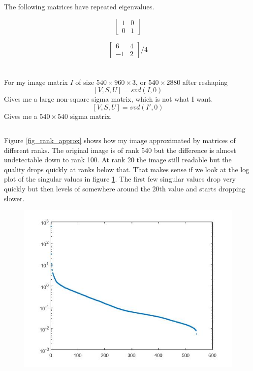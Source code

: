\documentclass[12pt]{article}
\begin{document}
The following matrices have repeated eigenvalues. 

\[
\begin{bmatrix}
    1 & 0 \\
    0 & 1
\end{bmatrix}
\]

\[
\begin{bmatrix}
    6 & 4 \\
    -1 & 2
\end{bmatrix} /4
\]

\section{}

\subsection{}

For my image matrix $I$ of size $540\times960\times3$, or $540\times2880$ after reshaping
\[[V, S, U] = svd(I, 0)\]
Gives me a large non-square sigma matrix, which is not what I want.
\[[V, S, U] = svd(I', 0)\]
Gives me a $540\times540$ sigma matrix.

\subsection{}

Figure \ref{fig_rank_approx} shows how my image approximated by matrices of different ranks. The original image is of rank 540 but the difference is almost undetectable down to rank 100. At rank 20 the image still readable but the quality drops quickly at ranks below that. That makes sense if we look at the log plot of the singular values in figure \ref{fig_sigma}. The first few singular values drop very quickly but then levels of somewhere around the 20th value and starts dropping slower.

\begin{figure}
    \includegraphics[width=0.6\linewidth]{plot_sigma}
    \centering
    \caption{}
    \label{fig_sigma}
\end{figure}
\end{document}
